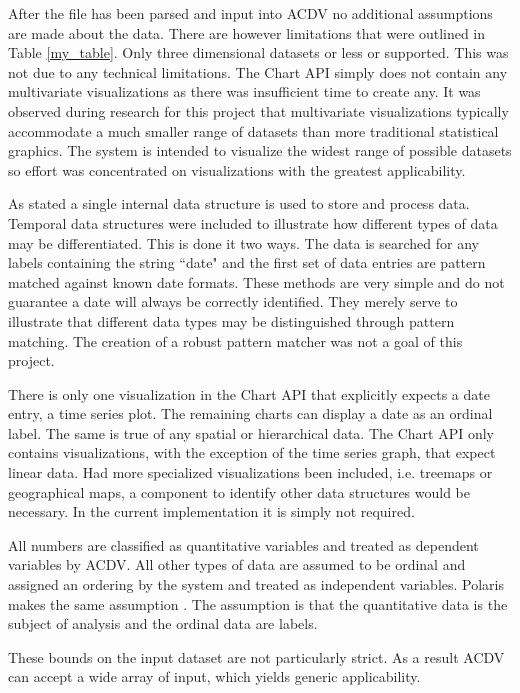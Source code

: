 \documentclass[a4paper, 11pt, titlepage, onehalfspacing]{report}
\begin{document}
After the file has been parsed and input into AC\lightning{}DV no additional assumptions are made about the data. There are however limitations that were outlined in Table \ref{my_table}. Only three dimensional datasets or less or supported. This was not due to any technical limitations. The Chart API simply does not contain any multivariate visualizations as there was insufficient time to create any. It was observed during research for this project that multivariate visualizations typically accommodate a much smaller range of datasets than more traditional statistical graphics. The system is intended to visualize the widest range of possible datasets so effort was concentrated on visualizations with the greatest applicability.

As stated a single internal data structure is used to store and process data. Temporal data structures were included to illustrate how different types of data may be differentiated. This is done it two ways. The data is searched for any labels containing the string ``date" and the first set of data entries are pattern matched against known date formats. These methods are very simple and do not guarantee a date will always be correctly identified. They merely serve to illustrate that different data types may be distinguished through pattern matching. The creation of a robust pattern matcher was not a goal of this project. 

There is only one visualization in the Chart API that explicitly expects a date entry, a time series plot. The remaining charts can display a date as an ordinal label. The same is true of any spatial or hierarchical data. The Chart API only contains visualizations, with the exception of the time series graph, that expect linear data. Had more specialized visualizations been included, i.e. treemaps or geographical maps, a component to identify other data structures would be necessary. In the current implementation it is simply not required.

All numbers are classified as quantitative variables and treated as dependent variables by AC\lightning{}DV. All other types of data are assumed to be ordinal and assigned an ordering by the system and treated as independent variables. Polaris makes the same assumption \cite{stolte2002polaris}. The assumption is that the quantitative data is the subject of analysis and the ordinal data are labels.

These bounds on the input dataset are not particularly strict. As a result AC\lightning{}DV can accept a wide array of input, which yields generic applicability.
\end{document}
